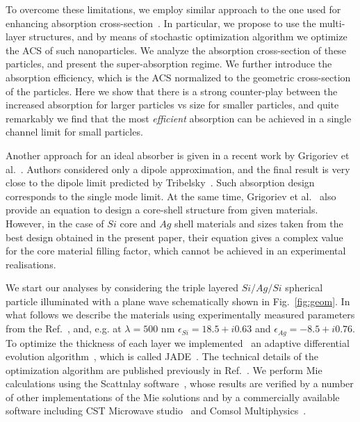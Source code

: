 \documentclass[aps,prl,twocolumn,showpacs,superscriptaddress,groupedaddress]{revtex4-1}
\begin{document}
To overcome these limitations, we employ similar approach to the one used for
enhancing absorption cross-section~\cite{Fan-2011}. In particular, we
propose to use the multi-layer structures, and by means of stochastic
optimization algorithm we optimize the ACS of such nanoparticles. We
analyze the absorption cross-section of these particles, and present
the super-absorption regime. We further introduce the absorption
efficiency, which is the ACS normalized to the geometric cross-section
of the particles. Here we show that there is a strong counter-play
between the increased absorption for larger particles vs size for
smaller particles, and quite remarkably we find that the most {\em
  efficient} absorption can be achieved in a single channel limit for
small particles.

Another approach for an ideal absorber is given in a recent work by
Grigoriev et al.~\cite{Grigoriev-2015}. Authors considered only
a dipole approximation, and the final result is very close to the dipole limit predicted by
Tribelsky~\cite{Tribelsky-2011}.  Such absorption design
corresponds to the single mode limit.  At the same time, Grigoriev et
al.~\cite{Grigoriev-2015} also provide an equation to design a
core-shell structure from given materials. However, in the case of
$Si$ core and $Ag$ shell materials and sizes taken from the best design obtained in the present paper, their equation gives a complex value for the core material filling factor, which cannot be achieved in an experimental realisations.

\begin{figure}
\end{figure}


We start our analyses by considering the triple layered $Si/Ag/Si$
spherical particle illuminated with a plane
wave schematically shown in Fig.~\ref{fig:geom}. In what follows we describe the materials
using experimentally measured parameters from the
Ref.~\cite{palik-1997}, and, e.g. at $\lambda = 500$ nm $\epsilon_{Si} = 18.5 + i0.63$ and
$\epsilon_{Ag} = -8.5 + i0.76$.  To optimize the thickness of each
layer we implemented~\cite{JADE-web} an adaptive differential
evolution algorithm~\cite{Storn-DE-first-1997}, which is called
JADE~\cite{Jingqiao-JADE-2009}.  The technical details of the
optimization algorithm are published previously in
Ref.~\cite{Ladutenko-2014}. We perform Mie calculations using the
Scattnlay software~\cite{Pena-scattnlay-2009,Scattnlay-web}, whose
results are verified by a number of other implementations of the
Mie solutions and by a commercially available software including CST
Microwave studio~\cite{CST-web} and Comsol Multiphysics~\cite{Comsol-web}.
\end{document}
